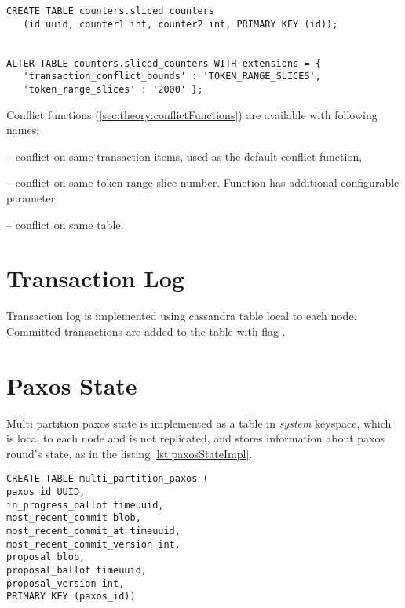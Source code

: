 \begin{lstlisting}[style=outcode,label={lst:configureConflictFunctions},caption={Configuring conflict function on Cassandra table}]
CREATE TABLE counters.sliced_counters 
   (id uuid, counter1 int, counter2 int, PRIMARY KEY (id));


ALTER TABLE counters.sliced_counters WITH extensions = { 
   'transaction_conflict_bounds' : 'TOKEN_RANGE_SLICES', 
   'token_range_slices' : '2000' };
\end{lstlisting}


Conflict functions (\ref{sec:theory:conflictFunctions}) are available with following names:
\begin{enumerate*}
\item {} -- conflict on same transaction items, used as the default conflict function,
\item {} -- conflict on same token range slice number. Function has additional configurable parameter 
\item {} -- conflict on same table.
\end{enumerate*}

\section{Transaction Log}
Transaction log is implemented using cassandra table local to each node. 
Committed transactions are added to the table with flag . 


\section{Paxos State}
Multi partition paxos state is implemented as a table in \emph{system} keyspace, which is local to each node and is not replicated, and stores information about paxos round's state, as in the listing \ref{lst:paxosStateImpl}.

\begin{lstlisting}[style=outcode,label={lst:paxosStateImpl},caption={Table definition for multi partition paxos state}]
CREATE TABLE multi_partition_paxos (
paxos_id UUID,
in_progress_ballot timeuuid,
most_recent_commit blob,
most_recent_commit_at timeuuid,
most_recent_commit_version int,
proposal blob,
proposal_ballot timeuuid,
proposal_version int,
PRIMARY KEY (paxos_id))
\end{lstlisting}



